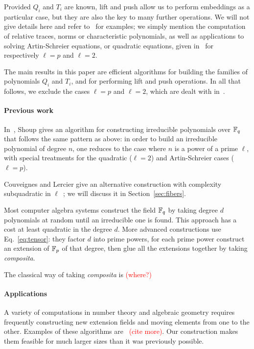 \documentclass{sig-alternate}
\newcommand{\todo}[1]{\textcolor{red}{(#1)}}
\begin{document}
Provided $Q_i$ and $T_i$ are known, lift and push allow us to perform
embeddings as a particular case, but they are also the key to many
further operations. We will not give details here and refer
to~\cite{df+schost12,DoSc12,LeSc12} for examples; we simply mention
the computation of relative traces, norms or characteristic
polynomials, as well as applications to solving Artin-Schreier
equations, or quadratic equations, given in~\cite{df+schost12,DoSc12}
for respectively $\ell=p$ and $\ell=2$.

The main results in this paper are efficient algorithms for building
the families of polynomials $Q_i$ and $T_i$, and for performing lift
and push operations. In all that follows, we exclude the cases
$\ell=p$ and $\ell=2$, which are dealt with
in~\cite{df+schost12,DoSc12}.

\paragraph*{\bf Previous work}
In~\cite{Shoup90,shoup94}, Shoup gives an algorithm for constructing
irreducible polynomials over $\mathbb{F}_q$ that follows the same pattern as
above: in order to build an irreducible polynomial of degree $n$, one
reduces to the case where $n$ is a power of a prime $\ell$, with
special treatments for the quadratic ($\ell=2$) and Artin-Schreier
cases ($\ell=p$).

Couveignes and Lercier give an alternative construction with
complexity subquadratic in $\ell$~\cite{couveignes+lercier11}; we will
discuss it in Section~\ref{sec:fibers}.


Most computer algebra systems construct the field $\mathbb{F}_q$ by taking
degree $d$ polynomials at random until an irreducible one is
found. This approach has a cost at least quadratic in the degree
$d$. More advanced constructions use Eq.~\eqref{eq:tensor}: they
factor $d$ into prime powers, for each prime power construct an
extension of $\mathbb{F}_p$ of that degree, then glue all the extensions
together by taking \emph{composita}.

The classical way of taking \emph{composita} is \todo{where?}

\paragraph*{\bf Applications}
A variety of computations in number theory and algebraic geometry
requires frequently constructing new extension fields and moving
elements from one to the other. Examples of these algorithms
are~\cite{df10} \todo{cite more}. Our construction makes them feasible
for much larger sizes than it was previously possible.
\end{document}
